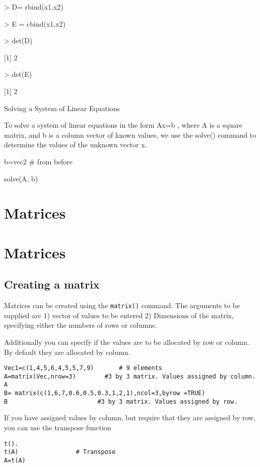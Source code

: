 > D= rbind(x1,x2)


> E = cbind(x1,x2)


> det(D)


[1] 2


> det(E)


[1] 2

 


Solving a System of Linear Equations


To solve a system of linear equations in the form Ax=b , where A is a square matrix, and b is a column vector of known values, we use the solve() command to determine the values of the unknown vector x.










b=vec2  # from before


solve(A, b) 
 



\section{Matrices}

%
\section{Matrices}
\subsection{Creating a matrix}
Matrices can be created using the \texttt{matrix()} command. The arguments to be supplied are 1) vector of values to be entered
2) Dimensions of the matrix, specifying either the numbers of rows or columns.

Additionally you can specify if the values are to be allocated by row or column. By default they are allocated by column.
\begin{verbatim}
Vec1=c(1,4,5,6,4,5,5,7,9)		# 9 elements
A=matrix(Vec,nrow=3)		#3 by 3 matrix. Values assigned by column.
A
B= matrix(c(1,6,7,0.6,0.5,0.3,1,2,1),ncol=3,byrow =TRUE)
B				          #3 by 3 matrix. Values assigned by row.
\end{verbatim}	
If you have assigned values by column, but require that they are assigned by row, you can use the transpose function
\begin{verbatim}
t().
t(A)				# Transpose
A=t(A)	
\end{verbatim}

